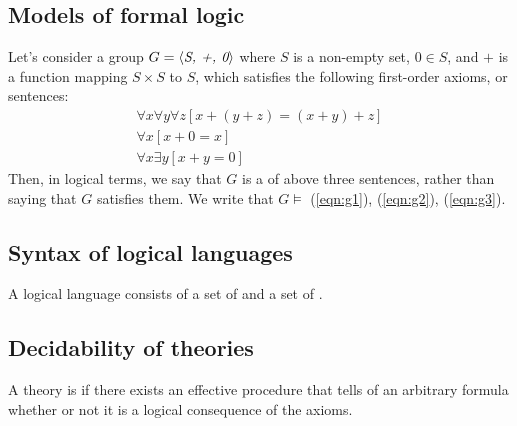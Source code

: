 \subsection{Models of formal logic}
Let's consider a group $G = \mbox{$\langle{\textit{S, +, 0}}\rangle$}$ where $S$ is a non-empty set, $0
\in S$, and $+$ is a function mapping $S \times S$ to $S$, which satisfies the
following first-order axioms, or sentences:
  \begin{eqnarray}
\label{eqn:g1}  &\forall{x}\forall{y}\forall{z}[x + (y + z) = (x + y) + z]&\\ 
\label{eqn:g2}    & \forall{x}[x + 0 = x]&\\ 
\label{eqn:g3}  & \forall{x}\exists{y}[x +y = 0]
  \end{eqnarray}
Then, in logical terms, we say that $G$ is a  of above three
sentences, rather than saying that $G$ satisfies them.
We write that $G \models $ (\ref{eqn:g1}), (\ref{eqn:g2}), (\ref{eqn:g3}).



\subsection{Syntax of logical languages}
A logical language consists of a set of  and a set of
. 


\subsection{Decidability of theories}
A theory is  if there exists an effective procedure that 
tells of an arbitrary formula whether or not it is a logical consequence of
the axioms. 




